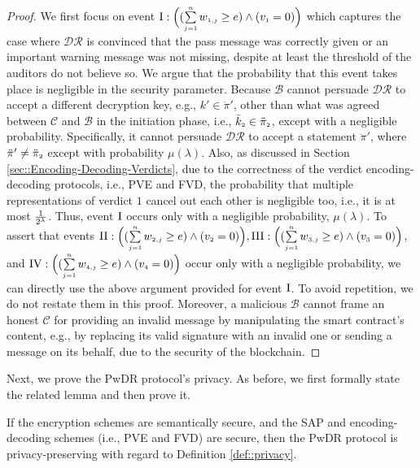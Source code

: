 \begin{proof}
%
We first focus on event $\text{\MakeUppercase{\romannumeral 1}}: \Big( (\sum\limits_{\st j=1}^{\st n}w_{\st 1,j}\geq e) \wedge ( v_{\st 1}=0)\Big)$ which captures the case where  $\mathcal{DR}$ is convinced that the pass message was correctly given or an important warning message was not missing, despite at least the threshold of the auditors do not believe so. We argue that the probability that this event takes place is negligible in the security parameter. Because $\mathcal{B}$ cannot persuade $\mathcal{DR}$ to accept a different decryption key, e.g., $k'\in \ddot\pi'$, other than what was agreed between $\mathcal{C}$ and $\mathcal{B}$ in the initiation phase, i.e., $\bar k_{\scriptscriptstyle 2}\in \ddot\pi_{\scriptscriptstyle 2}$, except with a negligible probability. Specifically, it cannot persuade  $\mathcal{DR}$ to accept a statement $\ddot \pi'$, where $\ddot \pi'\neq \ddot \pi_{\scriptscriptstyle 2}$ except with   probability $\mu(\lambda)$. Also, as discussed in Section \ref{sec::Encoding-Decoding-Verdicts}, due to the correctness of the verdict encoding-decoding protocols, i.e., PVE and FVD, the probability that multiple representations of verdict  $1$ cancel out each other is negligible too, i.e., it is at most $\frac{1}{2^{\scriptscriptstyle \lambda}}$. Thus,  event $\text{\MakeUppercase{\romannumeral 1}}$ occurs only with a negligible probability, $\mu(\lambda)$. To  assert that   events $\text{\MakeUppercase{\romannumeral 2}}: \Big(( \sum\limits_{\st j=1}^{\st n}w_{\st 2,j}\geq e) \wedge ( v_{\st 2}=0)\Big), \text{\MakeUppercase{\romannumeral 3}}: \Big(( \sum\limits_{\st j=1}^{\st n}w_{\st 3,j}\geq e) \wedge ( v_{\st 3}=0)\Big)$, and $\text{\MakeUppercase{\romannumeral 4}}: \Big(( \sum\limits_{\st j=1}^{\st n}w_{\st 4,j}\geq e) \wedge ( v_{\st 4}=0)\Big)$ occur only with a  negligible probability, we can directly use the above argument provided for event $\text{\MakeUppercase{\romannumeral 1}}$. To avoid repetition, we do not restate them in this proof.  Moreover, a malicious $\mathcal{B}$ cannot frame an honest $\mathcal{C}$ for providing an invalid message by manipulating the smart contract’s content,  e.g., by replacing its valid signature with an invalid one or sending a message on its behalf, due to the security of the blockchain.
\end{proof}


Next, we prove the PwDR protocol's privacy. As before, we first formally state the related lemma and then prove it. 


\begin{lemma}\label{lemma::privacy}
If the encryption schemes are semantically secure, and the SAP and encoding-decoding schemes (i.e., PVE and FVD)  are secure, then the PwDR protocol is privacy-preserving with regard to Definition \ref{def::privacy}.  
\end{lemma}

